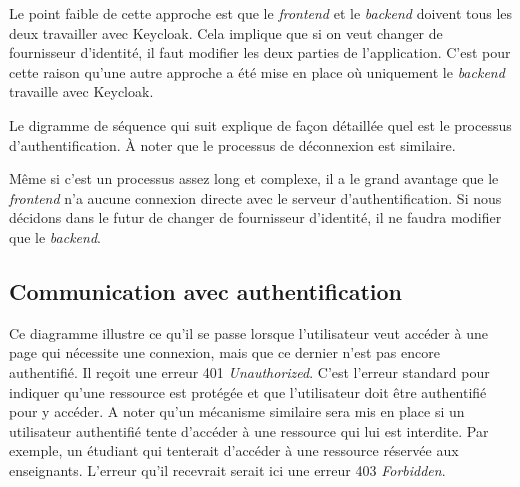 Le point faible de cette approche est que le \emph{frontend} et le \emph{backend} doivent tous les deux travailler avec Keycloak. Cela implique que si on veut changer de fournisseur d'identité, il faut modifier les deux parties de l'application.
C'est pour cette raison qu'une autre approche a été mise en place où uniquement le \emph{backend} travaille avec Keycloak.

Le digramme de séquence qui suit explique de façon détaillée quel est le processus d'authentification. À noter que le processus de déconnexion est similaire.

Même si c'est un processus assez long et complexe, il a le grand avantage que le \emph{frontend} n'a aucune connexion directe avec le serveur d'authentification. Si nous décidons dans le futur de changer de fournisseur d'identité, il ne faudra modifier que le \emph{backend}.

\subsection{Communication avec authentification}


Ce diagramme illustre ce qu'il se passe lorsque l'utilisateur veut accéder à une page qui nécessite une connexion, mais que ce dernier n'est pas encore authentifié. Il reçoit une erreur 401 \emph{Unauthorized}. C'est l'erreur standard pour indiquer qu'une ressource est protégée et que l'utilisateur doit être authentifié pour y accéder. A noter qu'un mécanisme similaire sera mis en place si un utilisateur authentifié tente d'accéder à une ressource qui lui est interdite. Par exemple, un étudiant qui tenterait d'accéder à une ressource réservée aux enseignants. L'erreur qu'il recevrait serait ici une erreur 403 \emph{Forbidden}.